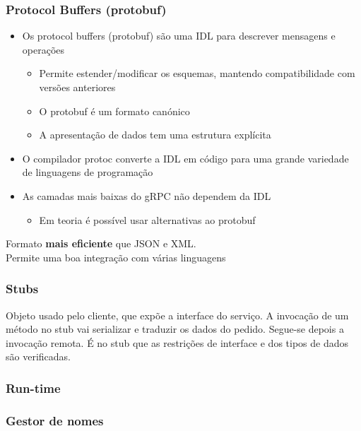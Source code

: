 \documentclass[12pt]{article}
\begin{document}
\subsubsection{Protocol Buffers (protobuf)}

\begin{itemize}
    \item Os protocol buffers (protobuf) são uma IDL para descrever mensagens e operações
    \begin{itemize}
        \item Permite estender/modificar os esquemas, mantendo compatibilidade
        com versões anteriores
        \item O protobuf é um formato canónico
        \item A apresentação de dados tem uma estrutura explícita
    \end{itemize}
    \item O compilador protoc converte a IDL em código para uma grande
    variedade de linguagens de programação
    \item As camadas mais baixas do gRPC não dependem da IDL
    \begin{itemize}
        \item Em teoria é possível usar alternativas ao protobuf
    \end{itemize}
\end{itemize}

Formato \textbf{mais eficiente} que JSON e XML.\\
Permite uma boa integração com várias linguagens

\subsubsection{Stubs}

Objeto usado pelo cliente, que expõe a interface do serviço. A invocação de um método no stub vai serializar e traduzir os dados do pedido. Segue-se depois a invocação remota. É no stub que as restrições de interface e dos tipos de dados são verificadas.

\subsubsection{Run-time}

\subsubsection{Gestor de nomes}
\end{document}
